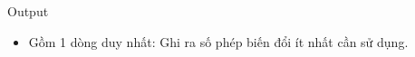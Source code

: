 Output
\begin{itemize}
	\item     Gồm 1 dòng duy nhất: Ghi ra số phép biến đổi ít nhất cần sử dụng.   
\end{itemize}